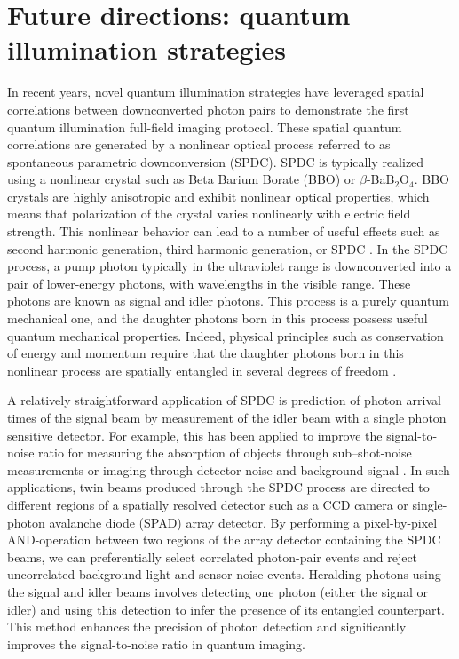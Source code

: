 \section{Future directions: quantum illumination strategies}

In recent years, novel quantum illumination strategies have leveraged spatial correlations between downconverted photon pairs to demonstrate the first quantum illumination full-field imaging protocol. These spatial quantum correlations are generated by a nonlinear optical process referred to as spontaneous parametric downconversion (SPDC). SPDC is typically realized using a nonlinear crystal such as Beta Barium Borate (BBO) or $\beta$-BaB$_2$O$_4$. BBO crystals are highly anisotropic and exhibit nonlinear optical properties, which means that polarization of the crystal varies nonlinearly with electric field strength. This nonlinear behavior can lead to a number of useful effects such as second harmonic generation, third harmonic generation, or SPDC \parencite{Boyd2020}. In the SPDC process, a pump photon typically in the ultraviolet range is downconverted into a pair of lower-energy photons, with wavelengths in the visible range. These photons are known as signal and idler photons. This process is a purely quantum mechanical one, and the daughter photons born in this process possess useful quantum mechanical properties. Indeed, physical principles such as conservation of energy and momentum require that the daughter photons born in this nonlinear process are spatially entangled in several degrees of freedom \parencite{Boyd2020}. 


A relatively straightforward application of SPDC is prediction of photon arrival times of the signal beam by measurement of the idler beam with a single photon sensitive detector. For example, this has been applied to improve the signal-to-noise ratio for measuring the absorption of objects through sub–shot-noise measurements \parencite{Brida2010} or imaging through detector noise and background signal \parencite{Gregory2020,Wolley2022}. In such applications, twin beams produced through the SPDC process are directed to different regions of a spatially resolved detector such as a CCD camera or single-photon avalanche diode (SPAD) array detector. By performing a pixel-by-pixel AND-operation between two regions of the array detector containing the SPDC beams, we can preferentially select correlated photon-pair events and reject uncorrelated background light and sensor noise events. Heralding photons using the signal and idler beams involves detecting one photon (either the signal or idler) and using this detection to infer the presence of its entangled counterpart. This method enhances the precision of photon detection and significantly improves the signal-to-noise ratio in quantum imaging.

